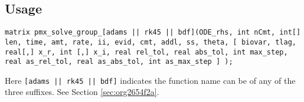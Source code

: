 \documentclass[12pt, reqno, oneside]{amsbook}
\numberwithin{equation}{chapter}
\numberwithin{figure}{chapter}
\numberwithin{table}{chapter}
\theoremstyle{remark}
\begin{document}
\subsection{Usage}
\label{sec:orgca1a777}
\begin{verbatim}
matrix pmx_solve_group_[adams || rk45 || bdf](ODE_rhs, int nCmt, int[] len, time, amt, rate, ii, evid, cmt, addl, ss, theta, [ biovar, tlag, real[,] x_r, int [,] x_i, real rel_tol, real abs_tol, int max_step, real as_rel_tol, real as_abs_tol, int as_max_step ] );
\end{verbatim}
Here \texttt{[adams || rk45 || bdf]} indicates the
function name can be of any of the three suffixes. See Section \ref{sec:org2654f2a}.
\end{document}
